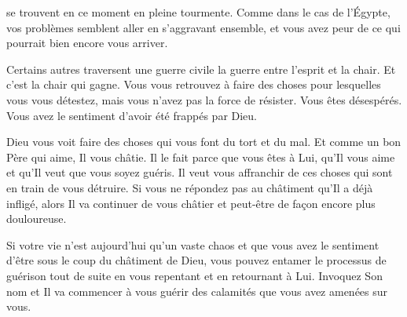 \dvrule






 se trouvent en ce moment
 en pleine tourmente.
 Comme dans le cas de l'Égypte, vos problèmes semblent aller
 en s'aggravant ensemble, et vous avez peur de ce qui pourrait
 bien encore vous arriver. 

Certains autres traversent une guerre civile
 \ocadr la guerre entre l'esprit et la chair.
 Et c'est la chair qui gagne. Vous vous retrouvez à faire des choses
 pour lesquelles vous vous détestez, mais vous n'avez pas la force
 de résister. Vous êtes désespérés. Vous avez le sentiment
 d'avoir été frappés par Dieu. 



Dieu vous voit faire des choses qui vous font du tort et du mal.
 Et comme un bon Père qui aime, Il vous châtie.
 Il le fait parce que vous êtes à Lui, qu'Il vous aime
 et qu'Il veut que vous soyez guéris.
 Il veut vous affranchir de ces choses qui sont en train de vous détruire.
 Si vous ne répondez pas au châtiment qu'Il a déjà infligé,
 alors Il va continuer de vous châtier
 \ocadr et peut-être de façon encore plus douloureuse. 

Si votre vie n'est aujourd'hui qu'un vaste chaos et que vous avez le sentiment
 d'être sous le coup du châtiment de Dieu, vous pouvez entamer le processus
 de guérison tout de suite en vous repentant et en retournant à Lui.
 Invoquez Son nom et Il va commencer à vous guérir des calamités
 que vous avez amenées sur vous. 

\dvrule


